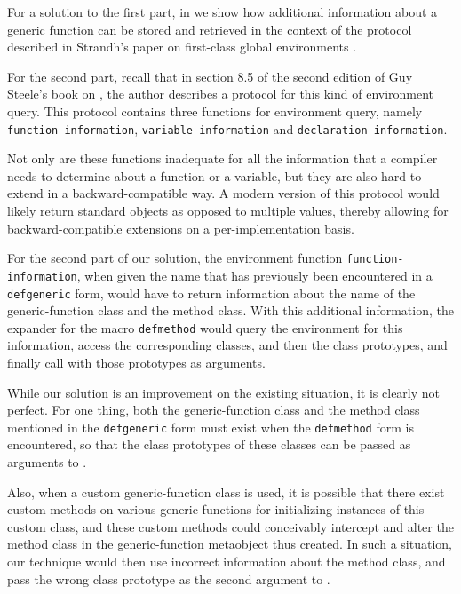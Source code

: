 For a solution to the first part, in  we show how
additional information about a generic function can be stored and
retrieved in the context of the protocol described in Strandh's paper
on first-class global environments
\cite{Strandh:2015:ELS:Environments}.

For the second part, recall that in section 8.5 of the second edition
of Guy Steele's book on \commonlisp{} \cite{Steele:1990:CLL:95411},
the author describes a protocol for this kind of environment query.
This protocol contains three functions for environment query, namely
\texttt{function-information}, \texttt{variable-information}
and \texttt{declaration-information}.

Not only are these functions inadequate for all the information that a
compiler needs to determine about a function or a variable, but they
are also hard to extend in a backward-compatible way.  A modern
version of this protocol would likely return standard objects as
opposed to multiple values, thereby allowing for backward-compatible
extensions on a per-implementation basis.

For the second part of our solution, the environment function
\texttt{function-information}, when given the name that has previously
been encountered in a \texttt{defgeneric} form, would have to return
information about the name of the generic-function class and the
method class.  With this additional information, the expander for the
macro \texttt{defmethod} would query the environment for this
information, access the corresponding classes, and then the class
prototypes, and finally call \mml{} with those prototypes as
arguments.

While our solution is an improvement on the existing situation, it is
clearly not perfect.  For one thing, both the generic-function class
and the method class mentioned in the \texttt{defgeneric} form must
exist when the \texttt{defmethod} form is encountered, so that the
class prototypes of these classes can be passed as arguments to \mml{}.

Also, when a custom generic-function class is used, it is possible
that there exist custom methods on various generic functions for
initializing instances of this custom class, and these custom methods
could conceivably intercept and alter the method class in the
generic-function metaobject thus created.  In such a situation, our
technique would then use incorrect information about the method class,
and pass the wrong class prototype as the second argument to \mml{}.

